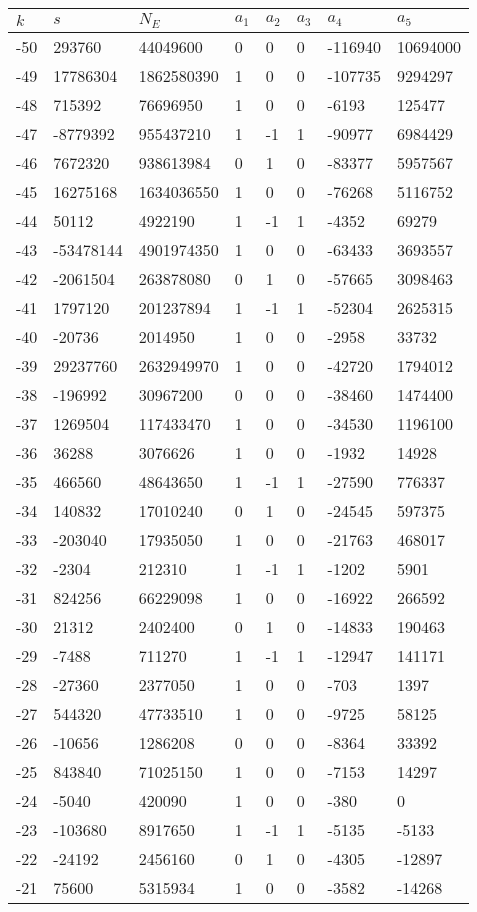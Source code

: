 \documentclass{amsart}
\begin{document}
\begin{longtable}{|l|l|l|lllll|}
\hline
$k$ & $s$ & $N_E$ & $a_1$ & $a_2$ & $a_3$ & $a_4$ & $a_5$\\
\hline
-50&293760&44049600&0&0&0&-116940&10694000\\
-49&17786304&1862580390&1&0&0&-107735&9294297\\
-48&715392&76696950&1&0&0&-6193&125477\\
-47&-8779392&955437210&1&-1&1&-90977&6984429\\
-46&7672320&938613984&0&1&0&-83377&5957567\\
-45&16275168&1634036550&1&0&0&-76268&5116752\\
-44&50112&4922190&1&-1&1&-4352&69279\\
-43&-53478144&4901974350&1&0&0&-63433&3693557\\
-42&-2061504&263878080&0&1&0&-57665&3098463\\
-41&1797120&201237894&1&-1&1&-52304&2625315\\
-40&-20736&2014950&1&0&0&-2958&33732\\
-39&29237760&2632949970&1&0&0&-42720&1794012\\
-38&-196992&30967200&0&0&0&-38460&1474400\\
-37&1269504&117433470&1&0&0&-34530&1196100\\
-36&36288&3076626&1&0&0&-1932&14928\\
-35&466560&48643650&1&-1&1&-27590&776337\\
-34&140832&17010240&0&1&0&-24545&597375\\
-33&-203040&17935050&1&0&0&-21763&468017\\
-32&-2304&212310&1&-1&1&-1202&5901\\
-31&824256&66229098&1&0&0&-16922&266592\\
-30&21312&2402400&0&1&0&-14833&190463\\
-29&-7488&711270&1&-1&1&-12947&141171\\
-28&-27360&2377050&1&0&0&-703&1397\\
-27&544320&47733510&1&0&0&-9725&58125\\
-26&-10656&1286208&0&0&0&-8364&33392\\
-25&843840&71025150&1&0&0&-7153&14297\\
-24&-5040&420090&1&0&0&-380&0\\
-23&-103680&8917650&1&-1&1&-5135&-5133\\
-22&-24192&2456160&0&1&0&-4305&-12897\\
-21&75600&5315934&1&0&0&-3582&-14268\\

\end{longtable}
\end{document}
